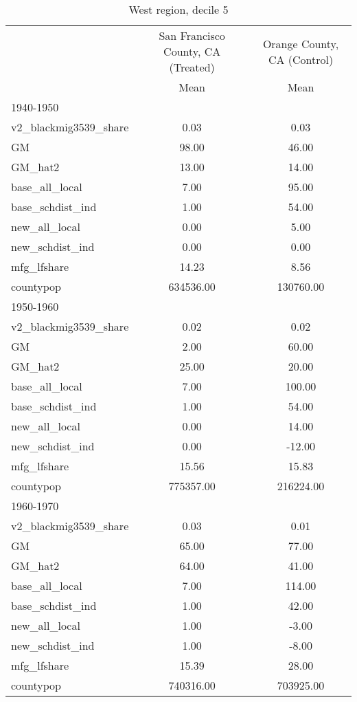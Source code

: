 \begin{table}[htbp]\centering
\def\sym#1{\ifmmode^{#1}\else\(^{#1}\)\fi}
\caption{West region, decile 5 \label{tab1}}
\begin{tabular}{l*{2}{c}}
\toprule
                    &\multicolumn{1}{c}{San Francisco County, CA (Treated)}&\multicolumn{1}{c}{Orange County, CA (Control)}\\
                    &        Mean&        Mean\\
\midrule
1940-1950           &            &            \\
v2\_blackmig3539\_share&        0.03&        0.03\\
GM                  &       98.00&       46.00\\
GM\_hat2             &       13.00&       14.00\\
base\_all\_local      &        7.00&       95.00\\
base\_schdist\_ind    &        1.00&       54.00\\
new\_all\_local       &        0.00&        5.00\\
new\_schdist\_ind     &        0.00&        0.00\\
mfg\_lfshare         &       14.23&        8.56\\
countypop           &   634536.00&   130760.00\\
\midrule
1950-1960           &            &            \\
v2\_blackmig3539\_share&        0.02&        0.02\\
GM                  &        2.00&       60.00\\
GM\_hat2             &       25.00&       20.00\\
base\_all\_local      &        7.00&      100.00\\
base\_schdist\_ind    &        1.00&       54.00\\
new\_all\_local       &        0.00&       14.00\\
new\_schdist\_ind     &        0.00&      -12.00\\
mfg\_lfshare         &       15.56&       15.83\\
countypop           &   775357.00&   216224.00\\
\midrule
1960-1970           &            &            \\
v2\_blackmig3539\_share&        0.03&        0.01\\
GM                  &       65.00&       77.00\\
GM\_hat2             &       64.00&       41.00\\
base\_all\_local      &        7.00&      114.00\\
base\_schdist\_ind    &        1.00&       42.00\\
new\_all\_local       &        1.00&       -3.00\\
new\_schdist\_ind     &        1.00&       -8.00\\
mfg\_lfshare         &       15.39&       28.00\\
countypop           &   740316.00&   703925.00\\
\bottomrule
\end{tabular}
\end{table}
